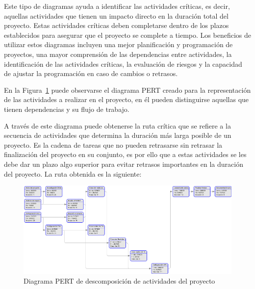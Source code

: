 Este tipo de diagramas ayuda a identificar las actividades críticas, es decir, aquellas actividades que tienen un impacto directo en la duración total del proyecto. Estas actividades críticas deben completarse dentro de los plazos establecidos para asegurar que el proyecto se complete a tiempo. Los beneficios de utilizar estos diagramas incluyen una mejor planificación y programación de proyectos, una mayor comprensión de las dependencias entre actividades, la identificación de las actividades críticas, la evaluación de riesgos y la capacidad de ajustar la programación en caso de cambios o retrasos.

En la Figura~\ref{fig:pert} puede observarse el diagrama PERT creado para la representación de las actividades a realizar en el proyecto, en él pueden distinguirse aquellas que tienen dependencias y su flujo de trabajo.

A través de este diagrama puede obtenerse la ruta crítica que se refiere a la secuencia de actividades que determina la duración más larga posible de un proyecto. Es la cadena de tareas que no pueden retrasarse sin retrasar la finalización del proyecto en su conjunto, es por ello que a estas actividades se les debe dar un plazo algo superior para evitar retrasos importantes en la duración del proyecto. La ruta obtenida es la siguiente:\\


\begin{figure}[p]
\centering
\includegraphics[scale=0.5,angle=90]{images/Pert.png}
\caption[Diagrama PERT]{Diagrama PERT de descomposición de actividades del proyecto}%
\label{fig:pert}
\end{figure}

